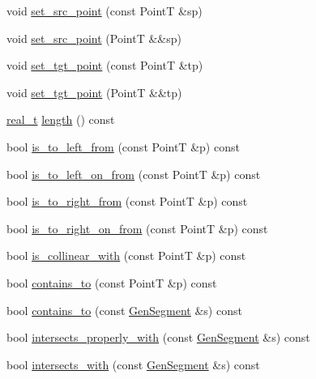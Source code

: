 \begin{DoxyCompactItemize}
void \hyperlink{class_designar_1_1_gen_segment_a27c902171ad387272a72a98f2ec74dca}{set\+\_\+src\+\_\+point} (const PointT \&sp)
\item 
void \hyperlink{class_designar_1_1_gen_segment_ace3bf4ead3e970f88cacfa03b4853c3f}{set\+\_\+src\+\_\+point} (PointT \&\&sp)
\item 
void \hyperlink{class_designar_1_1_gen_segment_a3338743508cb033732a3c9ffd4ceb6ea}{set\+\_\+tgt\+\_\+point} (const PointT \&tp)
\item 
void \hyperlink{class_designar_1_1_gen_segment_a218a089156740da0d16ec68b62f957d6}{set\+\_\+tgt\+\_\+point} (PointT \&\&tp)
\item 
\hyperlink{namespace_designar_aca2c32af26808dbec1f3a3071fad25ce}{real\+\_\+t} \hyperlink{class_designar_1_1_gen_segment_a9878c3c77157f54bf99ba33381bf0a5e}{length} () const
\item 
bool \hyperlink{class_designar_1_1_gen_segment_a46c8d175ffad89deeb79c11a82b32e1f}{is\+\_\+to\+\_\+left\+\_\+from} (const PointT \&p) const
\item 
bool \hyperlink{class_designar_1_1_gen_segment_aae82d258fa7819459f3d6512ca349af0}{is\+\_\+to\+\_\+left\+\_\+on\+\_\+from} (const PointT \&p) const
\item 
bool \hyperlink{class_designar_1_1_gen_segment_ad9f0ddae7b869161882185d5caeea5f8}{is\+\_\+to\+\_\+right\+\_\+from} (const PointT \&p) const
\item 
bool \hyperlink{class_designar_1_1_gen_segment_a7d2d5e4b54fa16fd953de345394e331b}{is\+\_\+to\+\_\+right\+\_\+on\+\_\+from} (const PointT \&p) const
\item 
bool \hyperlink{class_designar_1_1_gen_segment_af7bc45340416386ad14b3bcdc281faa2}{is\+\_\+collinear\+\_\+with} (const PointT \&p) const
\item 
bool \hyperlink{class_designar_1_1_gen_segment_a3c48e2a69f85d5825ca75c262347edc5}{contains\+\_\+to} (const PointT \&p) const
\item 
bool \hyperlink{class_designar_1_1_gen_segment_a77bee603f1b3fa154bb305e224573852}{contains\+\_\+to} (const \hyperlink{class_designar_1_1_gen_segment}{Gen\+Segment} \&s) const
\item 
bool \hyperlink{class_designar_1_1_gen_segment_ad28b958022d2c4d88f39855db2cc590c}{intersects\+\_\+properly\+\_\+with} (const \hyperlink{class_designar_1_1_gen_segment}{Gen\+Segment} \&s) const
\item 
bool \hyperlink{class_designar_1_1_gen_segment_ae14fc44c3b7b94850af6e13aff27eee1}{intersects\+\_\+with} (const \hyperlink{class_designar_1_1_gen_segment}{Gen\+Segment} \&s) const

\end{DoxyCompactItemize}
